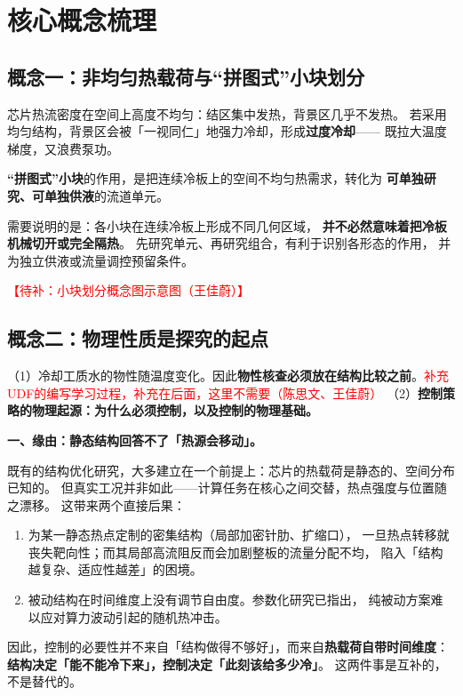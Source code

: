 \documentclass[stage1,fontset=fandol]{ydzjreport}
\begin{document}
	\section{核心概念梳理}
	
	\subsection{概念一：非均匀热载荷与“拼图式”小块划分}
	
	芯片热流密度在空间上高度不均匀：结区集中发热，背景区几乎不发热。
	若采用均匀结构，背景区会被「一视同仁」地强力冷却，形成\textbf{过度冷却}——
	既拉大温度梯度，又浪费泵功。
	
	\textbf{“拼图式”小块}的作用，是把连续冷板上的空间不均匀热需求，转化为
	\textbf{可单独研究、可单独供液}的流道单元。
	
	需要说明的是：各小块在连续冷板上形成不同几何区域，
	\textbf{并不必然意味着把冷板机械切开或完全隔热}。
	先研究单元、再研究组合，有利于识别各形态的作用，
	并为独立供液或流量调控预留条件。
	
	\textcolor{red}{【待补：小块划分概念图示意图（王佳蔚）】}
	
	\subsection{概念二：物理性质是探究的起点}
	
	（1）冷却工质水的物性随温度变化。因此\textbf{物性核查必须放在结构比较之前}。\textcolor{red}{补充UDF的编写学习过程，补充在后面，这里不需要（陈思文、王佳蔚）}
	（2）\textbf{控制策略的物理起源：为什么必须控制，以及控制的物理基础。}
	
	\textbf{一、缘由：静态结构回答不了「热源会移动」。}
	
	既有的结构优化研究，大多建立在一个前提上：芯片的热载荷是静态的、空间分布已知的。
	但真实工况并非如此——计算任务在核心之间交替，热点强度与位置随之漂移\cite{wu,ji}。
	这带来两个直接后果：
	
	\begin{enumerate}
		\item 为某一静态热点定制的密集结构（局部加密针肋、扩缩口），
		一旦热点转移就丧失靶向性；而其局部高流阻反而会加剧整板的流量分配不均，
		陷入「结构越复杂、适应性越差」的困境。
		\item 被动结构在时间维度上没有调节自由度。参数化研究已指出，
		纯被动方案难以应对算力波动引起的随机热冲击\cite{laguna}。
	\end{enumerate}
	
	因此，控制的必要性并不来自「结构做得不够好」，而来自\textbf{热载荷自带时间维度}：
	\textbf{结构决定「能不能冷下来」，控制决定「此刻该给多少冷」}。
	这两件事是互补的，不是替代的。
	
\end{document}
